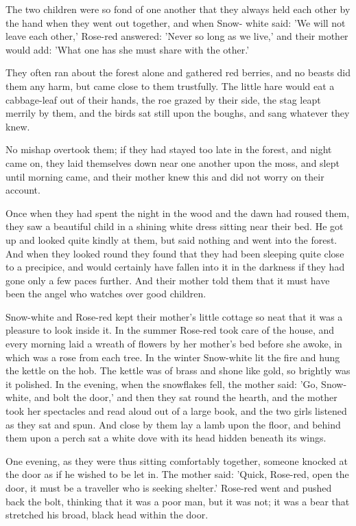 \documentclass[12pt]{book}
\begin{document}
The two children were so fond of one another that they always held
each other by the hand when they went out together, and when Snow-
white said: 'We will not leave each other,' Rose-red answered: 'Never
so long as we live,' and their mother would add: 'What one has she
must share with the other.'

They often ran about the forest alone and gathered red berries, and no
beasts did them any harm, but came close to them trustfully. The
little hare would eat a cabbage-leaf out of their hands, the roe
grazed by their side, the stag leapt merrily by them, and the birds
sat still upon the boughs, and sang whatever they knew.

No mishap overtook them; if they had stayed too late in the forest,
and night came on, they laid themselves down near one another upon the
moss, and slept until morning came, and their mother knew this and did
not worry on their account.

Once when they had spent the night in the wood and the dawn had roused
them, they saw a beautiful child in a shining white dress sitting near
their bed. He got up and looked quite kindly at them, but said nothing
and went into the forest. And when they looked round they found that
they had been sleeping quite close to a precipice, and would certainly
have fallen into it in the darkness if they had gone only a few paces
further. And their mother told them that it must have been the angel
who watches over good children.

Snow-white and Rose-red kept their mother's little cottage so neat
that it was a pleasure to look inside it. In the summer Rose-red took
care of the house, and every morning laid a wreath of flowers by her
mother's bed before she awoke, in which was a rose from each tree. In
the winter Snow-white lit the fire and hung the kettle on the hob. The
kettle was of brass and shone like gold, so brightly was it polished.
In the evening, when the snowflakes fell, the mother said: 'Go, Snow-
white, and bolt the door,' and then they sat round the hearth, and the
mother took her spectacles and read aloud out of a large book, and the
two girls listened as they sat and spun. And close by them lay a lamb
upon the floor, and behind them upon a perch sat a white dove with its
head hidden beneath its wings.

One evening, as they were thus sitting comfortably together, someone
knocked at the door as if he wished to be let in. The mother said:
'Quick, Rose-red, open the door, it must be a traveller who is seeking
shelter.' Rose-red went and pushed back the bolt, thinking that it was
a poor man, but it was not; it was a bear that stretched his broad,
black head within the door.
\end{document}

